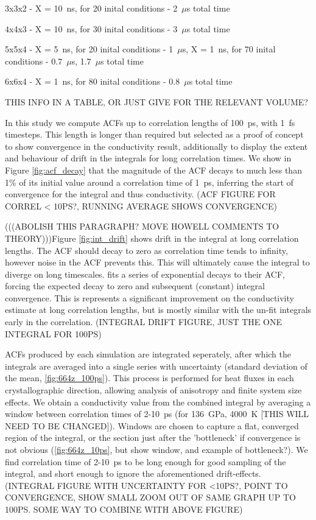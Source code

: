 \documentclass[%
preprint,                                  %
nofootinbib,
 amsmath,amssymb,
 aps,
]{revtex4-1}
\begin{document}
3x3x2 - X = 10~ns, for 20 inital conditions - 2~$\mu$s total time

4x4x3 - X = 10~ns, for 30 inital conditions - 3~$\mu$s total time

5x5x4 - X = 5~ns, for 20 inital conditions - 1~$\mu$s, X = 1~ns, for 70 inital conditions - 0.7~$\mu$s, 1.7~$\mu$s total time

6x6x4 - X = 1~ns, for 80 inital conditions - 0.8~$\mu$s total time

THIS INFO IN A TABLE, OR JUST GIVE FOR THE RELEVANT VOLUME?

In this study we compute ACFs up to correlation lengths of 100~ps, with 1~fs timesteps. This length is longer than required but selected as a proof of concept to show convergence in the conductivity result, additionally to display the extent and behaviour of drift in the integrals for long correlation times. We show in Figure \ref{fig:acf_decay} that the magnitude of the ACF decays to much less than 1\% of its initial value around a correlation time of 1~ps, inferring the start of convergence for the integral and thus conductivity. (ACF FIGURE FOR CORREL < 10PS?, RUNNING AVERAGE SHOWS CONVERGENCE) 

(((ABOLISH THIS PARAGRAPH? MOVE HOWELL COMMENTS TO THEORY)))Figure \ref{fig:int_drift} shows drift in the integral at long correlation lengths. The ACF should decay to zero as correlation time tends to infinity, however noise in the ACF prevents this. This will ultimately cause the integral to diverge on long timescales. \citet{Howell2012} fits a series of exponential decays to their ACF, forcing the expected decay to zero and subsequent (constant) integral convergence. This is represents a significant improvement on the conductivity estimate at long correlation lengths, but is mostly similar with the un-fit integrals early in the correlation. (INTEGRAL DRIFT FIGURE, JUST THE ONE INTEGRAL FOR 100PS)

ACFs produced by each simulation are integrated seperately, after which the integrals are averaged into a single series with uncertainty (standard deviation of the mean, \ref{fig:664z_100ps}). This process is performed for heat fluxes in each crystallographic direction, allowing analysis of anisotropy and finite system size effects. We obtain a conductivity value from the combined integral by averaging a window between correlation times of 2-10~ps (for 136~GPa, 4000~K [THIS WILL NEED TO BE CHANGED]). Windows are chosen to capture a flat, converged region of the integral, or the section just after the 'bottleneck' if convergence is not obvious (\ref{fig:664z_10ps}, but show window, and example of bottleneck?). We find correlation time of 2-10~ps to be long enough for good sampling of the integral, and short enough to ignore the aforementioned drift-effects. (INTEGRAL FIGURE WITH UNCERTAINTY FOR <10PS?, POINT TO CONVERGENCE, SHOW SMALL ZOOM OUT OF SAME GRAPH UP TO 100PS. SOME WAY TO COMBINE WITH ABOVE FIGURE)
\end{document}
